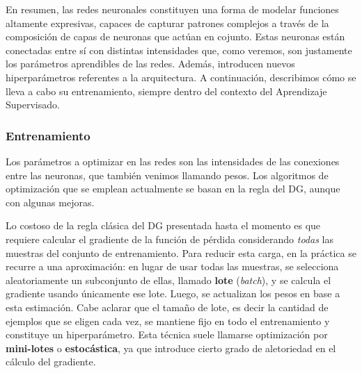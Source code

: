 \documentclass[../../main.tex]{subfiles}
\begin{document}

\bigskip
En resumen, las redes neuronales constituyen una forma de modelar funciones altamente
expresivas, capaces de capturar patrones complejos a través de la composición de capas de
neuronas que actúan en cojunto. Estas neuronas están conectadas entre sí con distintas
intensidades que, como veremos, son justamente los parámetros aprendibles de las redes.
Además, introducen nuevos hiperparámetros referentes a la arquitectura. A continuación,
describimos cómo se lleva a cabo su entrenamiento, siempre dentro del contexto del
Aprendizaje Supervisado.

\subsubsection{Entrenamiento}
Los parámetros a optimizar en las redes son las intensidades de las conexiones entre las
neuronas, que también venimos llamando pesos. Los algoritmos de optimización que se
emplean actualmente se basan en la regla del DG, aunque con algunas mejoras.

Lo costoso de la regla clásica del DG presentada hasta el momento es que requiere calcular
el gradiente de la función de pérdida considerando \textit{todas} las muestras del
conjunto de entrenamiento. Para reducir esta carga, en la práctica se recurre a una
aproximación: en lugar de usar todas las muestras, se selecciona aleatoriamente un
subconjunto de ellas, llamado \textbf{lote} (\textit{batch}), y se calcula el gradiente
usando únicamente ese lote. Luego, se actualizan los pesos en base a esta estimación. Cabe
aclarar que el tamaño de lote, es decir la cantidad de ejemplos que se eligen cada vez, se
mantiene fijo en todo el entrenamiento y constituye un hiperparámetro. Esta técnica suele
llamarse optimización por \textbf{mini-lotes} o \textbf{estocástica}, ya que introduce
cierto grado de aletoriedad en el cálculo del gradiente.
\end{document}
